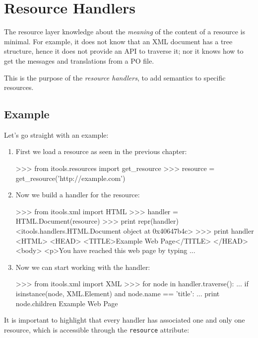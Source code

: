 \chapter{Resource Handlers}

The resource layer knowledge about the {\em meaning} of the content of
a resource is minimal. For example, it does not know that an XML document
has a tree structure, hence it does not provide an API to traverse it; nor
it knows how to get the messages and translations from a PO file.

This is the purpose of the {\em resource handlers}, to add semantics to
specific resources.


\section{Example}

Let's go straight with an example:

\begin{enumerate}
  \item First we load a resource as seen in the previous chapter:
\begin{code}
    >>> from itools.resources import get_resource
    >>> resource = get_resource('http://example.com')
\end{code}

  \item Now we build a handler for the resource:
\begin{code}
    >>> from itools.xml import HTML
    >>> handler = HTML.Document(resource)
    >>> print repr(handler)
    <itools.handlers.HTML.Document object at 0x40647b4c>
    >>> print handler
    <HTML>
    <HEAD>
      <TITLE>Example Web Page</TITLE>
    </HEAD> 
    <body>  
    <p>You have reached this web page by typing
    ...
\end{code}

  \item Now we can start working with the handler:
\begin{code}
    >>> from itools.xml import XML
    >>> for node in handler.traverse():
    ...     if isinstance(node, XML.Element) and node.name == 'title':
    ...         print node.children
    Example Web Page
\end{code}
\end{enumerate}



It is important to highlight that every handler has associated one and only
one resource, which is accessible through the {\tt resource} attribute:

